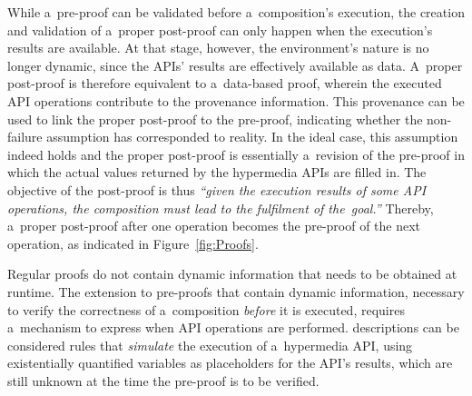 While a~pre-proof can be validated before a~composition's execution,
the creation and validation of a~proper post-proof can only happen
when the execution's results are available.
At that stage, however, the environment's nature is no longer dynamic,
since the APIs' results are effectively available as data.
A~proper post-proof is therefore equivalent to a~data-based proof,
wherein the executed API operations contribute to the provenance information.
This provenance can be used to link the proper post-proof to the pre-proof,
indicating whether the non-failure assumption has corresponded to reality.
In the ideal case, this assumption indeed holds
and the proper post-proof is essentially a~revision of the pre-proof
in which the actual values returned by the hypermedia APIs are filled in.
The objective of the post-proof is thus
\emph{``given the execution results of some API operations,
      the composition must lead to the fulfilment of the~goal.''}
Thereby, a~proper post-proof after one operation
becomes the pre-proof of the next operation,
as indicated in Figure~\ref{fig:Proofs}.

Regular proofs do not contain dynamic information that needs to be obtained at runtime.
The extension to pre-proofs that contain dynamic information,
necessary to verify the correctness of a~composition \emph{before} it is executed,
requires a~mechanism to express when API operations are performed.
\restdesc descriptions can be considered rules
that \emph{simulate} the execution of a~hypermedia API,
using existentially quantified variables as placeholders for the API's results,
which are still unknown at the time the pre-proof is to be verified.

